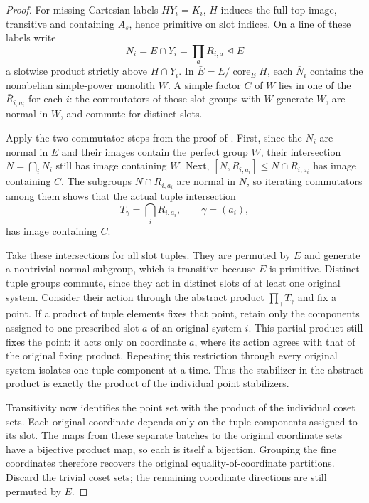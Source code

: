 \begin{proof}
For missing Cartesian labels \(HY_i=K_i\), \(H\) induces the full top image, transitive and containing \(A_s\), hence primitive on slot indices. On a line of these labels write
\[
 N_i=E\cap Y_i=\prod_a R_{i,a}\trianglelefteq E
\]
a slotwise product strictly above $H\cap Y_i$. In
$\bar E=E/\operatorname{core}_E H$, each $\bar N_i$ contains the
nonabelian simple-power monolith $W$. A simple factor $C$ of $W$ lies
in one of the $\bar R_{i,a_i}$ for each $i$: the commutators of those
slot groups with $W$ generate $W$, are normal in $W$, and commute for
distinct slots.

Apply the two commutator steps from the proof of
. First, since the $N_i$ are normal in $E$
and their images contain the perfect group $W$, their intersection
$N=\bigcap_iN_i$ still has image containing $W$. Next,
$[N,R_{i,a_i}]\le N\cap R_{i,a_i}$ has image containing $C$.
The subgroups $N\cap R_{i,a_i}$ are normal in $N$, so iterating
commutators among them shows that the actual tuple intersection
\[
 T_\gamma=\bigcap_iR_{i,a_i},\qquad \gamma=(a_i),
\]
has image containing $C$.

Take these intersections for all slot tuples. They are permuted by
$E$ and generate a nontrivial normal subgroup, which is transitive
because $E$ is primitive. Distinct tuple groups commute, since they
act in distinct slots of at least one original system. Consider their
action through the abstract product $\prod_\gamma T_\gamma$ and fix
a point. If a product of tuple elements fixes that point, retain only
the components assigned to one prescribed slot $a$ of an original
system $i$. This partial product still fixes the point: it acts only
on coordinate $a$, where its action agrees with that of the original
fixing product. Repeating this restriction through every original
system isolates one tuple component at a time. Thus the stabilizer
in the abstract product is exactly the product of the individual
point stabilizers.

Transitivity now identifies the point set with the product of the
individual coset sets. Each original coordinate depends only on the
tuple components assigned to its slot. The maps from these separate
batches to the original coordinate sets have a bijective product map,
so each is itself a bijection. Grouping the fine coordinates therefore
recovers the original equality-of-coordinate partitions. Discard the
trivial coset sets; the remaining coordinate directions are still
permuted by $E$.
\end{proof}

